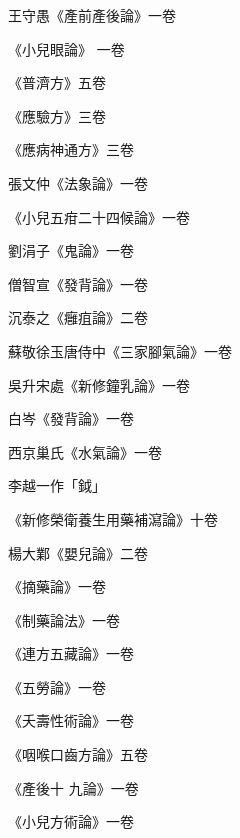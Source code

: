 \begin{pinyinscope}
 王守愚《產前產後論》一卷



 《小兒眼論》
 一卷



 《普濟方》五卷



 《應驗方》三卷



 《應病神通方》三卷



 張文仲《法象論》一卷



 《小兒五疳二十四候論》一卷



 劉涓子《鬼論》一卷



 僧智宣《發背論》一卷



 沉泰之《癰疽論》二卷



 蘇敬徐玉唐侍中《三家腳氣論》一卷



 吳升宋處《新修鐘乳論》一卷



 白岑《發背論》一卷



 西京巢氏《水氣論》一卷



 李越一作「鉞」



 《新修榮衛養生用藥補瀉論》十卷



 楊大鄴《嬰兒論》二卷



 《摘藥論》一卷



 《制藥論法》一卷



 《連方五藏論》一卷



 《五勞論》一卷



 《夭壽性術論》一卷



 《咽喉口齒方論》五卷



 《產後十
 九論》一卷



 《小兒方術論》一卷




\end{pinyinscope}
